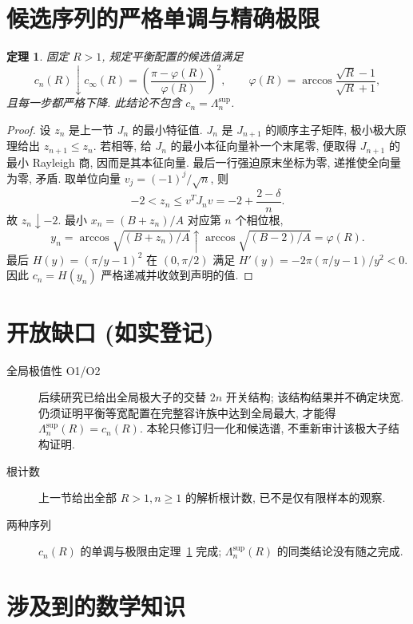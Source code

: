 \documentclass[UTF8]{ctexart}
\newtheorem{theorem}{定理}[section]
\begin{document}
\section{候选序列的严格单调与精确极限}
\begin{theorem}\label{thm:limit}
 固定 $R>1$, 规定平衡配置的候选值满足
 \[
 c_n(R)\downarrow c_\infty(R)
 =\left(\frac{\pi-\varphi(R)}{\varphi(R)}\right)^2,
 \qquad \varphi(R)=\arccos\frac{\sqrt R-1}{\sqrt R+1},
 \]
 且每一步都严格下降. 此结论不包含 $c_n=\Lambda_n^{\sup}$.
\end{theorem}
\begin{proof}
 设 $z_n$ 是上一节 $J_n$ 的最小特征值.
 $J_n$ 是 $J_{n+1}$ 的顺序主子矩阵, 极小极大原理给出 $z_{n+1}\le z_n$.
 若相等, 给 $J_n$ 的最小本征向量补一个末尾零, 便取得 $J_{n+1}$ 的最小
 Rayleigh 商, 因而是其本征向量. 最后一行强迫原末坐标为零, 递推使全向量为零, 矛盾.
 取单位向量 $v_j=(-1)^j/\sqrt n$, 则
 \[
 -2<z_n\le v^T J_n v=-2+\frac{2-\delta}{n}.
 \]
 故 $z_n\downarrow-2$. 最小 $x_n=(B+z_n)/A$ 对应第 $n$ 个相位根,
 \[
 y_n=\arccos\sqrt{(B+z_n)/A}\uparrow
 \arccos\sqrt{(B-2)/A}=\varphi(R).
 \]
 最后 $H(y)=(\pi/y-1)^2$ 在 $(0,\pi/2)$ 满足
 $H'(y)=-2\pi(\pi/y-1)/y^2<0$.
 因此 $c_n=H(y_n)$ 严格递减并收敛到声明的值.
\end{proof}

\section{开放缺口 (如实登记)}\label{sec:open}
\begin{description}
 \item[全局极值性 O1/O2] 后续研究已给出全局极大子的交替 $2n$ 开关结构;
  该结构结果并不确定块宽. 仍须证明平衡等宽配置在完整容许族中达到全局最大,
  才能得 $\Lambda_n^{\sup}(R)=c_n(R)$.
  本轮只修订归一化和候选谱, 不重新审计该极大子结构证明.
 \item[根计数] 上一节给出全部 $R>1,n\ge1$ 的解析根计数, 已不是仅有限样本的观察.
 \item[两种序列] $c_n(R)$ 的单调与极限由定理~\ref{thm:limit} 完成;
  $\Lambda_n^{\sup}(R)$ 的同类结论没有随之完成.
\end{description}

\section{涉及到的数学知识}
\end{document}
